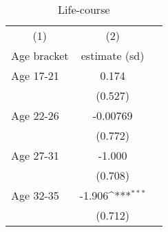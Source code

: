 \documentclass{scrartcl} %
\begin{document}
\begin{table}[H]\centering
\caption{Life-course}
 {\def\sym#1{\ifmmode^{#1}\else\(^{#1}\)\fi} 
	\begin{tabular}{lcc}
	\toprule
	\multicolumn{1}{c}{(1)}&\multicolumn{1}{c}{(2)} \\
	Age bracket & estimate (sd) \\
	\midrule
	Age 17-21 & 0.174  \\ 
	& (0.527) \\
	Age 22-26 & -0.00769  \\ 
	& (0.772) \\
	Age 27-31 & -1.000  \\ 
	& (0.708) \\ 
	Age 32-35 &	-1.906\sym{***} \\
	 & (0.712) \\
	 \bottomrule
	\end{tabular}} 
\end{table} 






\end{document}
